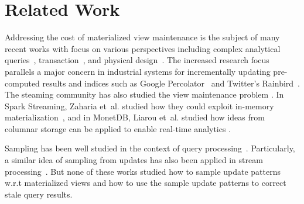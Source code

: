 \vspace{-.5em}
\section{Related Work}\label{related}
\vspace{-.25em}
Addressing the cost of materialized view maintenance is the subject of many recent works with
focus on various perspectives including complex analytical queries~\cite{nikolic2014linview}, transaction~\cite{bailis2014scalable}, and physical design~\cite{lefevre2014opportunistic}.
The increased research focus parallels a major concern in industrial systems for incrementally updating pre-computed results and indices such as Google Percolator~\cite{percolator} and Twitter's Rainbird~\cite{rainbird}.
The steaming community has also studied the view maintenance problem \cite{abadi2003aurora,golab2011consistency, golab2012scalable, he2010comet, ghanem2010supporting, KrishnamurthyFDFGLT10}. In Spark Streaming, Zaharia et~al. studied how they could exploit in-memory materialization~\cite{zaharia2012discretized}, and in MonetDB, Liarou et~al. studied how ideas from columnar storage can be applied to enable real-time analytics \cite{liarou2012monetdb}.


Sampling has been well studied in the context of query processing~\cite{AgarwalMPMMS13, olken1993random, garofalakis2001approximate}. Particularly, a similar idea of sampling from updates has also been applied in stream processing~\cite{tatbul2003load, Garofalakis, rabkin2014aggregation}. But none of these works studied how to sample update patterns w.r.t materialized views and how to use the sample update patterns to correct stale query results.

